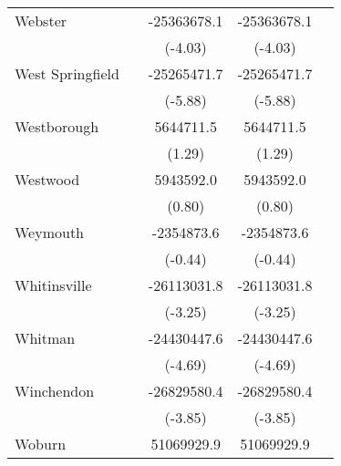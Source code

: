 {\begin{tabular}{l*{4}{c}}
\addlinespace
Webster             &                     & -25363678.1\sym{***}& -25363678.1\sym{***}&                     \\
                    &                     &     (-4.03)         &     (-4.03)         &                     \\
\addlinespace
West Springfield    &                     & -25265471.7\sym{***}& -25265471.7\sym{***}&                     \\
                    &                     &     (-5.88)         &     (-5.88)         &                     \\
\addlinespace
Westborough         &                     &   5644711.5         &   5644711.5         &                     \\
                    &                     &      (1.29)         &      (1.29)         &                     \\
\addlinespace
Westwood            &                     &   5943592.0         &   5943592.0         &                     \\
                    &                     &      (0.80)         &      (0.80)         &                     \\
\addlinespace
Weymouth            &                     &  -2354873.6         &  -2354873.6         &                     \\
                    &                     &     (-0.44)         &     (-0.44)         &                     \\
\addlinespace
Whitinsville        &                     & -26113031.8\sym{**} & -26113031.8\sym{**} &                     \\
                    &                     &     (-3.25)         &     (-3.25)         &                     \\
\addlinespace
Whitman             &                     & -24430447.6\sym{***}& -24430447.6\sym{***}&                     \\
                    &                     &     (-4.69)         &     (-4.69)         &                     \\
\addlinespace
Winchendon          &                     & -26829580.4\sym{***}& -26829580.4\sym{***}&                     \\
                    &                     &     (-3.85)         &     (-3.85)         &                     \\
\addlinespace
Woburn              &                     &  51069929.9\sym{***}&  51069929.9\sym{***}&                     \\

\end{tabular}}
